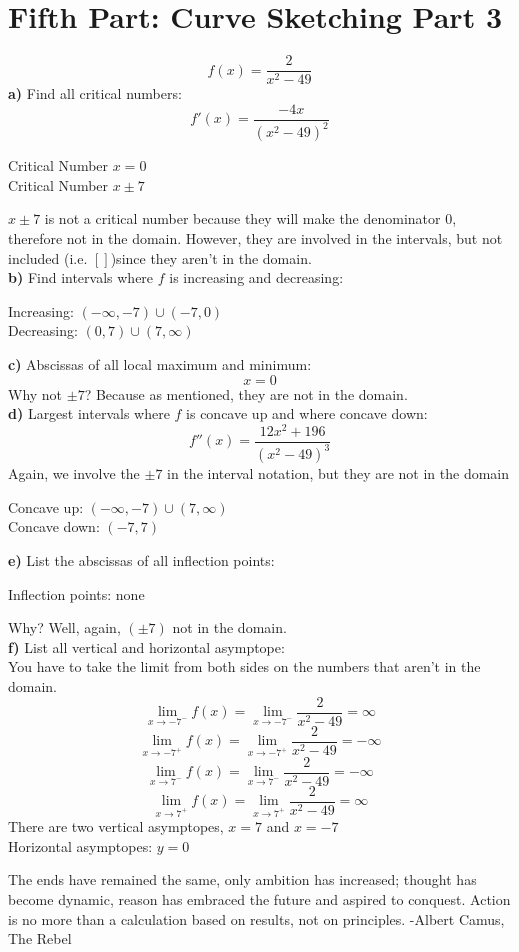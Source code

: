 \documentclass[12pt, letterpaper]{article}
\begin{document}
\section{Fifth Part: Curve Sketching Part 3}
\[f(x)=\frac{2}{x^2-49}\]
\textbf{a)} Find all critical numbers:
\[f'(x)=\frac{-4x}{(x^2-49)^2}\]
\begin{center}
    Critical Number \(x=0\)\\
    Critical Number \(x\pm7\)\\
\end{center}
\(x\pm7\) is not a critical number because they will make the denominator 0, therefore not in the domain. However, they are involved in the intervals, but not included (i.e. \([]\))since they aren't in the domain.\\
\newline
\textbf{b)} Find intervals where \(f\) is increasing and decreasing:
\begin{center}
    Increasing: \((-\infty,-7) \cup (-7,0)\)\\
    Decreasing: \((0,7) \cup (7,\infty)\)
\end{center}
\textbf{c)} Abscissas of all local maximum and minimum:
\[x=0\]
Why not \(\pm7\)? Because as mentioned, they are not in the domain.\\
\newline
\textbf{d)} Largest intervals where \(f\) is concave up and where concave down:
\[f''(x)=\frac{12x^2+196}{(x^2-49)^3}\]
Again, we involve the \(\pm7\) in the interval notation, but they are not in the domain
\begin{center}
    Concave up: \((-\infty,-7) \cup (7,\infty)\)\\
    Concave down: \((-7,7)\)
\end{center}
\textbf{e)} List the abscissas of all inflection points:
\begin{center}
    Inflection points: none
\end{center}
Why? Well, again, \((\pm7)\) not in the domain.\\
\newline
\textbf{f)} List all vertical and horizontal asymptope:\\
\newline
You have to take the limit from both sides on the numbers that aren't in the domain.
\[\lim_{x \to -7^-} f(x)=\lim_{x \to -7^-} \frac{2}{x^2-49} = \infty\]
\[\lim_{x \to -7^+} f(x)=\lim_{x \to -7^+} \frac{2}{x^2-49} = -\infty\]
\[\lim_{x \to 7^-} f(x)=\lim_{x \to 7^-} \frac{2}{x^2-49} = -\infty\]
\[\lim_{x \to 7^+} f(x)=\lim_{x \to 7^+} \frac{2}{x^2-49} = \infty\]
There are two vertical asymptopes, \(x=7\) and \(x=-7\)\\
Horizontal asymptopes: \(y=0\)

The ends have remained the same, only ambition has increased; thought has become dynamic, reason has embraced the future and aspired to conquest. Action is no more than a calculation based on results, not on principles. 
-Albert Camus, The Rebel
\end{document}
